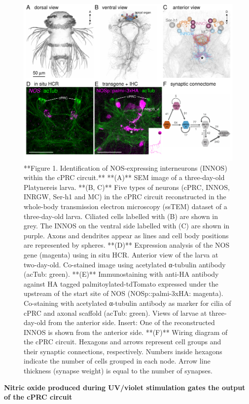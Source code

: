 \documentclass[
  10pt,
  onecolumn]{article}
\begin{document}
\begin{figure}
\includegraphics[width=25in]{figures/Fig1} \caption{**Figure 1. Identification of NOS-expressing interneurons (INNOS) within the cPRC circuit.** **(A)** SEM image of a three-day-old Platynereis larva. **(B, C)** Five types of neurons (cPRC, INNOS, INRGW, Ser-h1 and MC) in the cPRC circuit reconstructed in the whole-body transmission electron microscopy (ssTEM) dataset of a three-day-old larva. Ciliated cells labelled with (B) are shown in grey. The INNOS on the ventral side labelled with (C) are shown in purple. Axons and dendrites appear as lines and cell body positions are represented by spheres. **(D)** Expression analysis of the NOS gene (magenta) using in situ HCR. Anterior view of the larva at two-day-old. Co-stained image using acetylated α-tubulin antibody (acTub: green). **(E)** Immunostaining with anti-HA antibody against HA tagged palmitoylated-tdTomato expressed under the upstream of the start site of NOS (NOSp::palmi-3xHA: magenta). Co-staining with acetylated α-tubulin antibody as marker for cilia of cPRC and axonal scaffold (acTub: green). Views of larvae at three-day-old from the anterior side. Insert: One of the reconstructed INNOS is shown from the anterior side. **(F)** Wiring diagram of the cPRC circuit. Hexagons and arrows represent cell groups and their synaptic connections, respectively. Numbers inside hexagons indicate the number of cells grouped in each node. Arrow line thickness (synapse weight) is equal to the number of synapses.}\label{fig:unnamed-chunk-1}
\end{figure}

\textbf{Nitric oxide produced during UV/violet stimulation gates the
output of the cPRC circuit}
\end{document}
